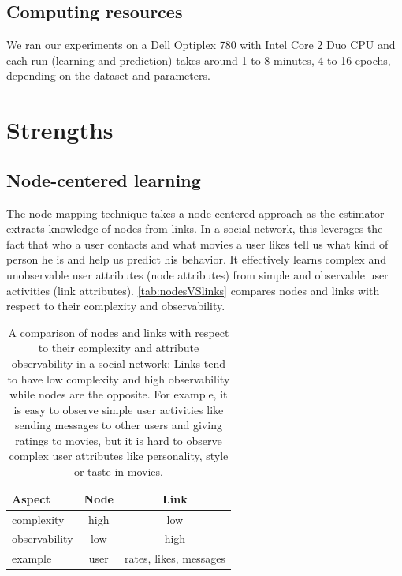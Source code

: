 \documentclass[twocolumn]{article}
\begin{document}
\subsection{Computing resources}
We ran our experiments on a Dell Optiplex 780 with Intel Core 2 Duo CPU and 
each run (learning and prediction) takes around 1 to 8 minutes, 4 to 16 epochs, 
depending on the dataset and parameters.

\section{Strengths}

\subsection{Node-centered learning}
The node mapping technique takes a node-centered approach as the estimator 
extracts knowledge of nodes from links.
In a social network, this leverages the fact that who a user contacts and what 
movies a user likes tell us what kind of person he is and help us predict his 
behavior.
It effectively learns complex and unobservable user attributes (node 
attributes) from simple and observable user activities (link attributes). 
\autoref{tab:nodesVSlinks} compares nodes and links with respect to their 
complexity and observability.
\begin{table}[h]
	\centering
	\caption{A comparison of nodes and links with respect to their complexity 
		and attribute observability in a social network:
		Links tend to have low complexity and high observability while nodes 
		are the opposite.
		For example, it is easy to observe simple user activities like sending 
		messages to other users and giving ratings to movies,
		but it is hard to observe complex user attributes like personality, 
		style or taste in movies.}
	\begin{tabularx}{0.5\textwidth}{ |X|c|c| } \hline
		\textbf{Aspect} & \textbf{Node} & \textbf{Link} \\ \hline
		complexity & high & low \\ \hline
		observability & low & high \\ \hline
		example & user & rates, likes, messages \\ \hline
	\end{tabularx}
	\label{tab:nodesVSlinks}
\end{table}
\end{document}

